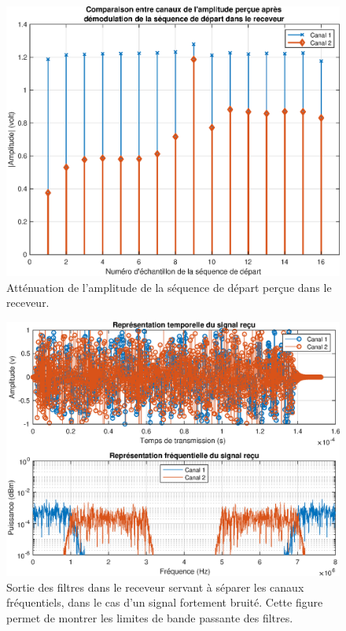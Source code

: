 \documentclass[10pt, oneside, a4paper]{article}
\begin{document}
\begin{figure}[!h]
    \centering
    \includegraphics[height=0.4\textheight]{eps/startSeq-comparaison.eps}
    \caption{Atténuation de l'amplitude de la séquence de départ perçue
             dans le receveur.}
\end{figure}
\vfill
\begin{figure}[!h]
    \centering
    \includegraphics[height=0.4\textheight]{eps/noised.eps}
    \caption{Sortie des filtres dans le receveur servant à séparer les canaux
             fréquentiels, dans le cas d'un signal fortement bruité.
             Cette figure permet de montrer les limites de bande passante des
             filtres.}
\end{figure}
\clearpage
\end{document}
